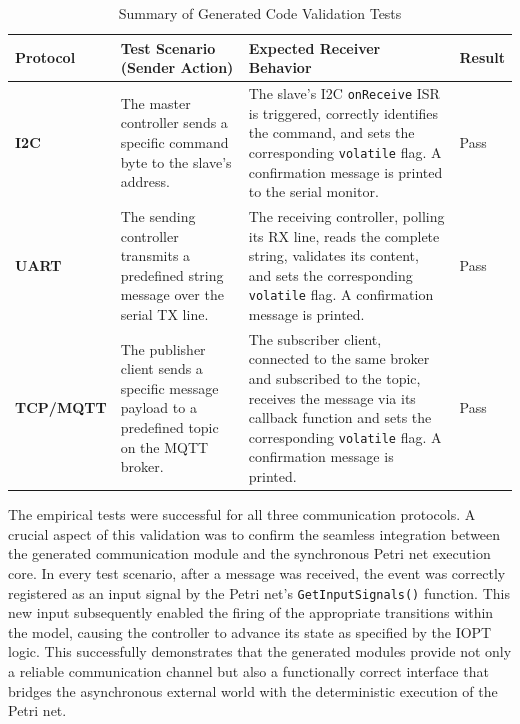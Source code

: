 \begin{table}[h!]
\centering
\caption{Summary of Generated Code Validation Tests}
\label{tab:code_validation_results}
\begin{tabular}{|l|p{4cm}|p{4cm}|p{2cm}|}
\hline
\textbf{Protocol} & \textbf{Test Scenario (Sender Action)} & \textbf{Expected Receiver Behavior} & \textbf{Result} \\ \hline
\textbf{I2C} & The master controller sends a specific command byte to the slave's address. & The slave's I2C \texttt{onReceive} ISR is triggered, correctly identifies the command, and sets the corresponding \texttt{volatile} flag. A confirmation message is printed to the serial monitor. & Pass \\ \hline
\textbf{UART} & The sending controller transmits a predefined string message over the serial TX line. & The receiving controller, polling its RX line, reads the complete string, validates its content, and sets the corresponding \texttt{volatile} flag. A confirmation message is printed. & Pass \\ \hline
\textbf{TCP/MQTT} & The publisher client sends a specific message payload to a predefined topic on the MQTT broker. & The subscriber client, connected to the same broker and subscribed to the topic, receives the message via its callback function and sets the corresponding \texttt{volatile} flag. A confirmation message is printed. & Pass \\ \hline
\end{tabular}
\end{table}

 The empirical tests were successful for all three communication protocols. A crucial aspect of this validation was to confirm the seamless integration between the generated communication module and the synchronous Petri net execution core. In every test scenario, after a message was received, the event was correctly registered as an input signal by the Petri net's \texttt{GetInputSignals()} function. This new input subsequently enabled the firing of the appropriate transitions within the model, causing the controller to advance its state as specified by the IOPT logic. This successfully demonstrates that the generated modules provide not only a reliable communication channel but also a functionally correct interface that bridges the asynchronous external world with the deterministic execution of the Petri net.


